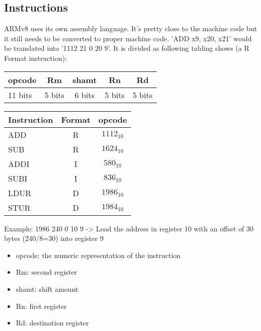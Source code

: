 \documentclass[a4paper]{scrartcl}
\begin{document}
        \subsection{Instructions}
            ARMv8 uses its own assembly language. It's pretty close to the machine code but it still needs to be converted to proper machine code. 'ADD x9, x20, x21'
            would be translated into '1112 21 0 20 9'. It is divided as following tabling shows (a R Format instruction): 
            \begin{center}
            \begin{tabular}{|p{5cm}|c|c|c|c|}
                \hline
                opcode & Rm & shamt & Rn & Rd \\
                \hline
                11 bits & 5 bits & 6 bits & 5 bits & 5 bits \\ 
                \hline
            \end{tabular}
            \end{center}
            \begin{center}
                \begin{tabular}{|p{5cm}|c|c|}
                    \hline
                    Instruction & Format & opcode  \\
                    \hline
                    ADD & R & $1112_{10}$ \\ 
                    \hline
                    SUB & R & $1624_{10}$ \\ 
                    \hline
                    ADDI & I & $580_{10}$ \\ 
                    \hline
                    SUBI & I & $836_{10}$ \\ 
                    \hline
                    LDUR & D & $1986_{10}$ \\ 
                    \hline
                    STUR & D & $1984_{10}$ \\ 
                    \hline
                \end{tabular}
            \end{center}
            Example: 1986 240 0 10 9 -> Load the address in register 10 with an offset of 30 bytes (240/8=30) into register 9
            \begin{itemize}
                \item opcode: the numeric representation of the instruction
                \item Rm: second register
                \item shamt: shift amount
                \item Rn: first register
                \item Rd: destination register
            \end{itemize}
        
\end{document}
